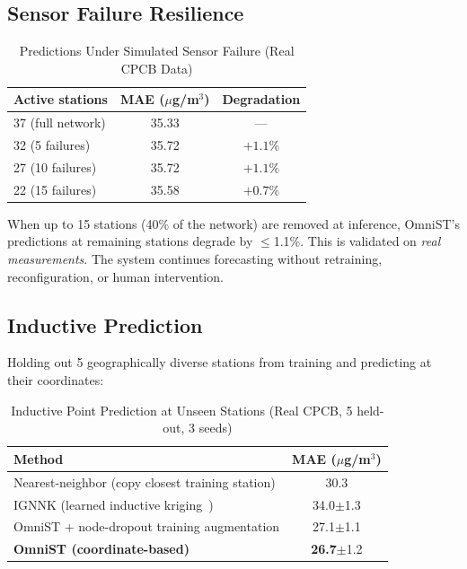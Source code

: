 \documentclass[journal]{IEEEtran}
\begin{document}
\subsection{Sensor Failure Resilience}

\begin{table}[htbp]
\caption{Predictions Under Simulated Sensor Failure (Real CPCB Data)}
\centering
\begin{tabular}{lcc}
\toprule
\textbf{Active stations} & \textbf{MAE ($\mu$g/m$^3$)} & \textbf{Degradation} \\
\midrule
37 (full network) & 35.33 & --- \\
32 (5 failures) & 35.72 & $+1.1\%$ \\
27 (10 failures) & 35.72 & $+1.1\%$ \\
22 (15 failures) & 35.58 & $+0.7\%$ \\
\bottomrule
\end{tabular}
\label{tab:resilience}
\end{table}

When up to 15 stations (40\% of the network) are removed at inference, OmniST's predictions at remaining stations degrade by $\leq$1.1\%. This is validated on \emph{real measurements}. The system continues forecasting without retraining, reconfiguration, or human intervention.

\subsection{Inductive Prediction}

Holding out 5 geographically diverse stations from training and predicting at their coordinates:

\begin{table}[htbp]
\caption{Inductive Point Prediction at Unseen Stations (Real CPCB, 5 held-out, 3 seeds)}
\centering
\begin{tabular}{lc}
\toprule
\textbf{Method} & \textbf{MAE ($\mu$g/m$^3$)} \\
\midrule
Nearest-neighbor (copy closest training station) & 30.3 \\
IGNNK (learned inductive kriging~\cite{ignnk2020}) & 34.0$\pm$1.3 \\
OmniST + node-dropout training augmentation & 27.1$\pm$1.1 \\
\textbf{OmniST (coordinate-based)} & \textbf{26.7}$\pm$1.2 \\
\bottomrule
\end{tabular}
\label{tab:inductive}
\end{table}
\end{document}
